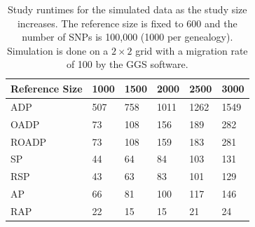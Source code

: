 \documentclass{article}
\begin{document}
\begin{table}
  \centering
  \begin{tabular}{|l|l|l|l|l|l|}
    \hline
    Reference Size & 1000 & 1500 & 2000 & 2500 & 3000 \\
    \hline
    ADP        & 507  & 758 & 1011 & 1262 & 1549 \\
    OADP       &  73  & 108 &  156 &  189 &  282 \\
    ROADP      &  73  & 108 &  159 &  183 &  281 \\
    SP         &  44  &  64 &   84 &  103 &  131 \\
    RSP        &  43  &  63 &   83 &  101 &  129 \\
    AP         &  66  &  81 &  100 &  117 &  146 \\
    RAP        &  22  &  15 &   15 &   21 &   24 \\
    \hline
  \end{tabular}
  \caption{
    Study runtimes for the simulated data as the study size increases.
    The reference size is fixed to 600 and the number of SNPs is 100,000 (1000 per genealogy). 
    Simulation is done on a $2 \times 2$ grid with a migration rate of 100 by the GGS software. 
  }
  \label{tbl:mChg-runtimes-study}
\end{table}
\end{document}
